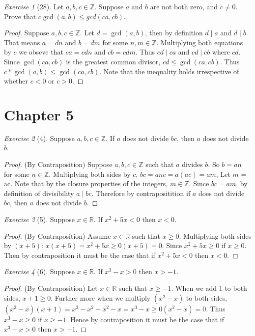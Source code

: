 \documentclass[12pt]{amsart}
\theoremstyle{remark}
\newtheorem*{exercise}{Exercise}%
\def\RR{\ensuremath{\mathbb R}}
\def\ZZ{\ensuremath{\mathbb Z}}
\theoremstyle{mycomment}
\begin{document}
\begin{exercise}[28] Let $a,b,c\in\ZZ$. Suppose $a$ and $b$ are not both  zero, and $c\ne 0$. Prove that $c\gcd(a,b)\le gcd(ca,cb)$.
\begin{proof}
	Suppose $a,b,c \in \ZZ$. Let $d = \gcd(a,b)$, then by definition $d \mid a$ and $d \mid b$. That means $a = dn$ and $b = dm$ for some $n,m \in \ZZ$. Multiplying both equations by $c$ we obseve that $ca = cdn$ and $cb = cdm$. Thus $cd \mid ca$ and $cd \mid cb$ where $cd$. Since $\gcd(ca, cb)$ is the greatest common divisor, $cd \leq \gcd(ca, cb)$. Thus $c*\gcd(a,b) \leq \gcd(ca, cb)$. Note that the inequality holds irrespective of whether $c < 0$ or $c > 0$.  
\end{proof}
\end{exercise}
\section*{Chapter 5}
\begin{exercise}[4] Suppose $a,b,c \in\ZZ$. If $a$ does not divide $bc$, then $a$ does not divide $b$.
\begin{proof}
	(By Contraposition) Suppose $a,b,c \in \ZZ$ such that $a$ divides $b$. So $b = an$ for some $n \in \ZZ$. Multiplying both sides by $c$, $bc = anc = a(ac) = am$, Let $m$ = ac. Note that by the closure properties of the integers, $m \in \ZZ$. Since $bc = am$, by definition of divisibility $a \mid bc$. Therefore by contrapositition if $a$ does not divide $bc$, then $a$ does not divide $b$. 
\end{proof}
\end{exercise}

\begin{exercise}[5] Suppose $x\in\RR$. %
If $x^{2}+5x<0$ then $x<0$.
\begin{proof}
	(By Contraposition) Assume $x \in \RR$ such that $x \geq 0$. Multiplying both sides by $(x+5)$: $x(x + 5) = x^2 + 5x \geq 0(x+5) = 0$. Since $x^2 + 5x \geq 0$ if $x \geq 0$. Then by contraposition it must be the case that if $x^2+5x < 0$ then $x < 0$.
\end{proof}
\end{exercise}

\begin{exercise}[6] Suppose $x\in\RR$. If $x^{3}-x>0$ then $x>-1$.
\begin{proof}
	(By Contraposition) Let $x \in \RR$ such that $x \geq -1$. When we add 1 to both sides, $x + 1 \geq 0$. Further more when we multiply $(x^2 - x)$ to both sides, $(x^2-x)(x + 1) = x^3 - x^2 + x^2 - x = x^3 - x \geq 0(x^2 - x) = 0$. Thus $x^3 - x \geq 0$ if $x \geq -1$. Hence by contraposition it must be the case that if $x^3 - x > 0$ then $x > -1$.
\end{proof}
\end{exercise}
\end{document}
